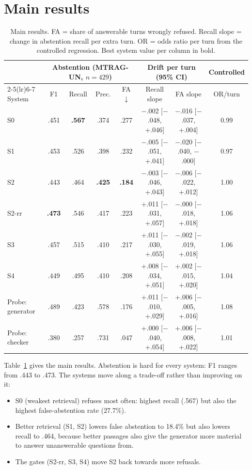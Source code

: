 \documentclass[11pt,a4paper]{report}
\newcommand{\sys}[1]{\textsf{#1}}
\begin{document}
\section{Main results}
\begin{table}[H]
\centering\small
\setlength{\tabcolsep}{2.5pt}
\begin{tabular}{@{}lccccccc@{}}
\toprule
& \multicolumn{4}{c}{Abstention (MTRAG-UN, $n=429$)} & \multicolumn{2}{c}{Drift per turn (95\% CI)} & Controlled \\
\cmidrule(lr){2-5}\cmidrule(lr){6-7}
System & F1 & Recall & Prec. & FA $\downarrow$ & Recall slope & FA slope & OR/turn \\
\midrule
\sys{S0} & .451 & \textbf{.567} & .374 & .277 & $-$.002 [$-$.048, +.046] & $-$.016 [$-$.037, +.004] & 0.99 \\
\sys{S1} & .453 & .526 & .398 & .232 & $-$.005 [$-$.051, +.041] & $-$.020 [$-$.040, $-$.000] & 0.97 \\
\sys{S2} & .443 & .464 & \textbf{.425} & \textbf{.184} & $-$.003 [$-$.046, +.043] & $-$.006 [$-$.022, +.012] & 1.00 \\
\sys{S2-rr} & \textbf{.473} & .546 & .417 & .223 & +.011 [$-$.031, +.057] & $-$.000 [$-$.018, +.018] & 1.06 \\
\sys{S3} & .457 & .515 & .410 & .217 & +.011 [$-$.030, +.055] & $-$.002 [$-$.019, +.018] & 1.06 \\
\sys{S4} & .449 & .495 & .410 & .208 & +.008 [$-$.034, +.051] & +.002 [$-$.015, +.020] & 1.04 \\
\midrule
Probe: generator & .489 & .423 & .578 & .176 & +.011 [$-$.010, +.029] & +.006 [$-$.005, +.016] & 1.08 \\
Probe: checker & .380 & .257 & .731 & .047 & +.000 [$-$.040, +.054] & +.006 [$-$.008, +.022] & 1.01 \\
\bottomrule
\end{tabular}
\caption{Main results. FA = share of answerable turns wrongly refused. Recall slope = change in abstention recall per extra turn. OR = odds ratio per turn from the controlled regression. Best system value per column in bold.}
\label{tab:main}
\end{table}

Table~\ref{tab:main} gives the main results. Abstention is hard for every system: F1 ranges from .443 to .473. The systems move along a trade-off rather than improving on it:
\begin{itemize}
\item \sys{S0} (weakest retrieval) refuses most often: highest recall (.567) but also the highest false-abstention rate (27.7\%).
\item Better retrieval (\sys{S1}, \sys{S2}) lowers false abstention to 18.4\% but also lowers recall to .464, because better passages also give the generator more material to answer unanswerable questions from.
\item The gates (\sys{S2-rr}, \sys{S3}, \sys{S4}) move \sys{S2} back towards more refusals.
\end{itemize}
\end{document}
